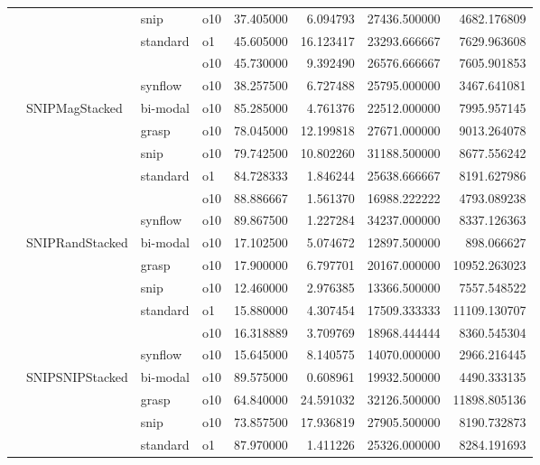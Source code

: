 \begin{longtable}{llllrrrr}
      &     & snip & o10 &  37.405000 &   6.094793 &     27436.500000 &   4682.176809 \\
      &     & standard & o1 &  45.605000 &  16.123417 &     23293.666667 &   7629.963608 \\
      &     &         & o10 &  45.730000 &   9.392490 &     26576.666667 &   7605.901853 \\
      &     & synflow & o10 &  38.257500 &   6.727488 &     25795.000000 &   3467.641081 \\
      & SNIPMagStacked & bi-modal & o10 &  85.285000 &   4.761376 &     22512.000000 &   7995.957145 \\
      &     & grasp & o10 &  78.045000 &  12.199818 &     27671.000000 &   9013.264078 \\
      &     & snip & o10 &  79.742500 &  10.802260 &     31188.500000 &   8677.556242 \\
      &     & standard & o1 &  84.728333 &   1.846244 &     25638.666667 &   8191.627986 \\
      &     &         & o10 &  88.886667 &   1.561370 &     16988.222222 &   4793.089238 \\
      &     & synflow & o10 &  89.867500 &   1.227284 &     34237.000000 &   8337.126363 \\
      & SNIPRandStacked & bi-modal & o10 &  17.102500 &   5.074672 &     12897.500000 &    898.066627 \\
      &     & grasp & o10 &  17.900000 &   6.797701 &     20167.000000 &  10952.263023 \\
      &     & snip & o10 &  12.460000 &   2.976385 &     13366.500000 &   7557.548522 \\
      &     & standard & o1 &  15.880000 &   4.307454 &     17509.333333 &  11109.130707 \\
      &     &         & o10 &  16.318889 &   3.709769 &     18968.444444 &   8360.545304 \\
      &     & synflow & o10 &  15.645000 &   8.140575 &     14070.000000 &   2966.216445 \\
      & SNIPSNIPStacked & bi-modal & o10 &  89.575000 &   0.608961 &     19932.500000 &   4490.333135 \\
      &     & grasp & o10 &  64.840000 &  24.591032 &     32126.500000 &  11898.805136 \\
      &     & snip & o10 &  73.857500 &  17.936819 &     27905.500000 &   8190.732873 \\
      &     & standard & o1 &  87.970000 &   1.411226 &     25326.000000 &   8284.191693 \\

\end{longtable}
